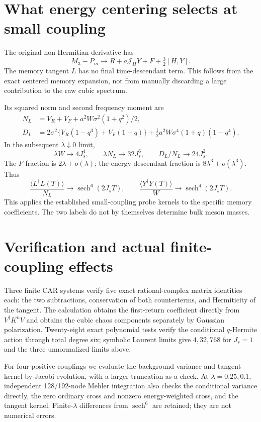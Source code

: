 \documentclass[11pt,a4paper]{article}
\newcommand{\av}[1]{\langle #1\rangle}
\begin{document}
\newpage
\section{What energy centering selects at small coupling}
The original non-Hermitian derivative has
\begin{equation}
 M_3-P_m\longrightarrow R+a\mathcal J_HY+F+\tfrac32[H,Y].
\end{equation}
The memory tangent $L$ has no final time-descendant term. This follows
from the exact centered memory expansion, not from manually discarding
a large contribution to the raw cubic spectrum.

Its squared norm and second frequency moment are
\begin{align}
 N_L&=V_R+V_F+a^2W\sigma^2(1+q^2)/2,\\
 D_L&=2\sigma^2\{V_R(1-q^3)+V_F(1-q)\}
       +\tfrac12 a^2W\sigma^4(1+q)(1-q^4).
\end{align}
In the subsequent $\lambda\downarrow0$ limit,
\begin{equation}
 \lambda W\to4J_s^4,\qquad \lambda N_L\to32J_s^6,
 \qquad D_L/N_L\to24J_s^2.
\end{equation}
The $F$ fraction is $2\lambda+o(\lambda)$; the energy-descendant
fraction is $8\lambda^3+o(\lambda^3)$. Thus
\begin{equation}
 \frac{\av{L^\dagger L(T)}}{N_L}\longrightarrow
 \operatorname{sech}^6(2J_sT),\qquad
 \frac{\av{Y^\dagger Y(T)}}W\longrightarrow
 \operatorname{sech}^4(2J_sT).
\end{equation}
This applies the established small-coupling probe kernels to the
specific memory coefficients. The two labels do not by themselves
determine bulk meson masses.

\section{Verification and actual finite-coupling effects}
Three finite CAR systems verify five exact rational-complex matrix
identities each: the two subtractions, conservation of both
counterterms, and Hermiticity of the tangent. The calculation obtains
the first-return coefficient directly from $V^\dagger K^nV$ and obtains
the cubic chaos components separately by Gaussian polarization.
Twenty-eight exact polynomial tests verify the conditional
$q$-Hermite action through total degree six; symbolic Laurent limits
give $4,32,768$ for $J_s=1$ and the three unnormalized limits above.

For four positive couplings we evaluate the background variance and
tangent kernel by Jacobi evolution, with a larger truncation as a
check. At $\lambda=0.25,0.1$, independent 128/192-node Mehler
integration also checks the conditional variance directly, the zero
ordinary cross and nonzero energy-weighted cross, and the tangent
kernel. Finite-$\lambda$ differences from $\operatorname{sech}^6$
are retained; they are not numerical errors.
\end{document}
